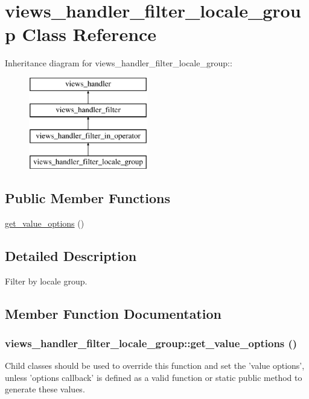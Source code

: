 \hypertarget{classviews__handler__filter__locale__group}{
\section{views\_\-handler\_\-filter\_\-locale\_\-group Class Reference}
\label{classviews__handler__filter__locale__group}
}
Inheritance diagram for views\_\-handler\_\-filter\_\-locale\_\-group::\begin{figure}[H]
\begin{center}
\leavevmode
\includegraphics[height=4cm]{classviews__handler__filter__locale__group}
\end{center}
\end{figure}
\subsection*{Public Member Functions}
\begin{DoxyCompactItemize}
\item 
\hyperlink{classviews__handler__filter__locale__group_a605b3625db570715d94299f05200a9c7}{get\_\-value\_\-options} ()
\end{DoxyCompactItemize}


\subsection{Detailed Description}
Filter by locale group. 

\subsection{Member Function Documentation}
\hypertarget{classviews__handler__filter__locale__group_a605b3625db570715d94299f05200a9c7}{
\subsubsection[{get\_\-value\_\-options}]{\setlength{\rightskip}{0pt plus 5cm}views\_\-handler\_\-filter\_\-locale\_\-group::get\_\-value\_\-options ()}}
\label{classviews__handler__filter__locale__group_a605b3625db570715d94299f05200a9c7}
Child classes should be used to override this function and set the 'value options', unless 'options callback' is defined as a valid function or static public method to generate these values.

